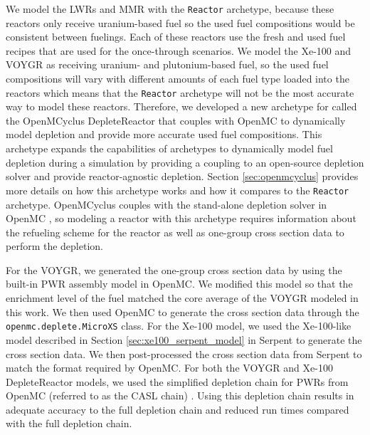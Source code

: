 

We model the \glspl{LWR} and \gls{MMR} 
with the 
\Cycamore \texttt{Reactor} archetype, because these reactors 
only receive uranium-based fuel so the used fuel compositions 
would be consistent between fuelings. Each of these reactors use the 
fresh and used fuel recipes that are used for the once-through scenarios.
We model the Xe-100 and VOYGR as receiving uranium- and plutonium-based 
fuel, so the used fuel compositions will vary with different amounts 
of each fuel type loaded into the reactors which means that the 
\Cycamore \texttt{Reactor} archetype will not be the most accurate 
way to model these reactors. Therefore, we developed a new 
archetype for \Cyclus called the OpenMCyclus DepleteReactor that 
couples \Cyclus with OpenMC \cite{romano_openmc:_2015} to 
dynamically model depletion and 
provide more accurate used fuel compositions.  
This archetype expands the capabilities of \Cyclus archetypes 
to dynamically model fuel depletion during a simulation by providing 
a coupling to an open-source depletion solver and provide
reactor-agnostic depletion. Section 
\ref{sec:openmcyclus} provides more details on how this archetype 
works and how it compares to the \Cycamore \texttt{Reactor} 
archetype. OpenMCyclus couples with the stand-alone depletion 
solver in OpenMC \cite{romano_depletion_2021}, so modeling a 
reactor with this archetype requires information about the refueling 
scheme for the reactor as well as one-group cross section data to 
perform the depletion. 

For the VOYGR, we generated the one-group cross section data by using the 
built-in \gls{PWR} assembly model in OpenMC. We modified this model so 
that the enrichment level of the fuel matched the core average of the 
VOYGR modeled in this work. We then used OpenMC to generate the cross 
section data through the \texttt{openmc.deplete.MicroXS} class.
For the Xe-100 model, we used the Xe-100-like model described in Section 
\ref{sec:xe100_serpent_model} in Serpent \cite{leppanen_serpent_2014}
to generate the cross section data. We then
post-processed the cross section data from Serpent to match the 
format required by OpenMC. For both the VOYGR and Xe-100 
DepleteReactor models, we used the simplified 
depletion chain for \glspl{PWR} from OpenMC 
(referred to as the CASL chain) 
\cite{romano_depletion_2021}. Using this depletion chain results in  
adequate accuracy to the full depletion chain \cite{romano_depletion_2021}
and reduced run times compared with the full depletion chain.  

